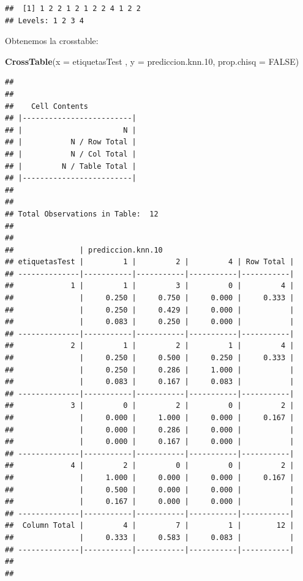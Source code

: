 \documentclass[]{article}
\newenvironment{Shaded}{\begin{snugshade}}{\end{snugshade}}
\newcommand{\KeywordTok}[1]{\textcolor[rgb]{0.13,0.29,0.53}{\textbf{#1}}}
\newcommand{\DataTypeTok}[1]{\textcolor[rgb]{0.13,0.29,0.53}{#1}}
\newcommand{\DecValTok}[1]{\textcolor[rgb]{0.00,0.00,0.81}{#1}}
\newcommand{\OtherTok}[1]{\textcolor[rgb]{0.56,0.35,0.01}{#1}}
\newcommand{\NormalTok}[1]{#1}
\begin{document}
\begin{verbatim}
##  [1] 1 2 2 1 2 1 2 2 4 1 2 2
## Levels: 1 2 3 4
\end{verbatim}

Obtenemos la crosstable:

\begin{Shaded}
\begin{Highlighting}[]
\KeywordTok{CrossTable}\NormalTok{(}\DataTypeTok{x =}\NormalTok{ etiquetasTest , }\DataTypeTok{y =}\NormalTok{ prediccion.knn.}\DecValTok{10}\NormalTok{, }\DataTypeTok{prop.chisq =} \OtherTok{FALSE}\NormalTok{)}
\end{Highlighting}
\end{Shaded}

\begin{verbatim}
## 
##  
##    Cell Contents
## |-------------------------|
## |                       N |
## |           N / Row Total |
## |           N / Col Total |
## |         N / Table Total |
## |-------------------------|
## 
##  
## Total Observations in Table:  12 
## 
##  
##               | prediccion.knn.10 
## etiquetasTest |         1 |         2 |         4 | Row Total | 
## --------------|-----------|-----------|-----------|-----------|
##             1 |         1 |         3 |         0 |         4 | 
##               |     0.250 |     0.750 |     0.000 |     0.333 | 
##               |     0.250 |     0.429 |     0.000 |           | 
##               |     0.083 |     0.250 |     0.000 |           | 
## --------------|-----------|-----------|-----------|-----------|
##             2 |         1 |         2 |         1 |         4 | 
##               |     0.250 |     0.500 |     0.250 |     0.333 | 
##               |     0.250 |     0.286 |     1.000 |           | 
##               |     0.083 |     0.167 |     0.083 |           | 
## --------------|-----------|-----------|-----------|-----------|
##             3 |         0 |         2 |         0 |         2 | 
##               |     0.000 |     1.000 |     0.000 |     0.167 | 
##               |     0.000 |     0.286 |     0.000 |           | 
##               |     0.000 |     0.167 |     0.000 |           | 
## --------------|-----------|-----------|-----------|-----------|
##             4 |         2 |         0 |         0 |         2 | 
##               |     1.000 |     0.000 |     0.000 |     0.167 | 
##               |     0.500 |     0.000 |     0.000 |           | 
##               |     0.167 |     0.000 |     0.000 |           | 
## --------------|-----------|-----------|-----------|-----------|
##  Column Total |         4 |         7 |         1 |        12 | 
##               |     0.333 |     0.583 |     0.083 |           | 
## --------------|-----------|-----------|-----------|-----------|
## 
## 
\end{verbatim}
\end{document}
